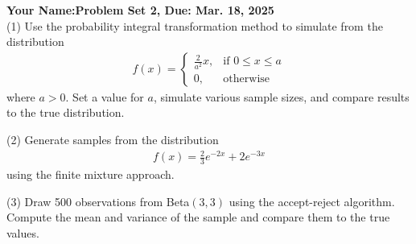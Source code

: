 \documentclass[final,11pt]{article}
\begin{document}
\thispagestyle{empty}
\begin{spacing}{1.25}

\textbf{Your Name:\hfill Problem Set 2, Due: Mar. 18, 2025}\\

(1) Use the probability integral transformation method to simulate from the distribution
\begin{gather}
    f(x) = 
    \begin{cases}
        \frac{2}{a^2}x,  & \text{if }0\leq x\leq a \\
        0, & \text{otherwise}
    \end{cases}
\end{gather}
where $a>0$. Set a value for $a$, simulate various sample sizes, and compare results to the true distribution.

\newpage

(2) Generate samples from the distribution
\begin{gather}
    f(x)=\frac{2}{3}e^{-2x}+2e^{-3x}
\end{gather}
using the finite mixture approach.

\newpage

(3) Draw 500 observations from Beta$(3,3)$ using the accept-reject algorithm. Compute the mean and variance of the sample and compare them to the true values.

\end{spacing}
\end{document}
